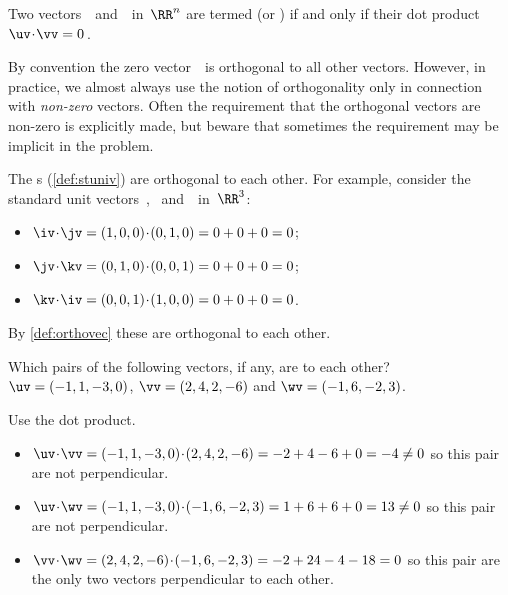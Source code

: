 \begin{definition} \label{def:orthovec}
Two vectors~\uv\ and~\vv\ in~\(\RR^n\) are termed
 (or )
if and only if their dot product \(\uv\cdot\vv=0\)\,.
\end{definition}

By convention the zero vector~\ov\ is orthogonal to all other vectors.
However, in practice, we almost always use the notion of orthogonality only in connection with \emph{non-zero} vectors.
Often the requirement that the orthogonal vectors are non-zero is explicitly made, but beware that sometimes the requirement may be implicit in the problem.


\begin{example} \label{eg:}
The s (\autoref{def:stuniv}) are orthogonal to each other.
For example, consider the standard unit vectors~\iv, \jv\ and~\kv\ in~\(\RR^3\):
\begin{itemize}
\item \(\iv\cdot\jv=(1,0,0)\cdot(0,1,0)=0+0+0=0\);
\item \(\jv\cdot\kv=(0,1,0)\cdot(0,0,1)=0+0+0=0\);
\item \(\kv\cdot\iv=(0,0,1)\cdot(1,0,0)=0+0+0=0\).
\end{itemize}
By \autoref{def:orthovec} these are orthogonal to each other.
\end{example}


\begin{example} \label{eg:}
Which pairs of the following vectors, if any, are  to each other?
\(\uv=(-1,1,-3,0)\), \(\vv=(2,4,2,-6)\) and \(\wv=(-1,6,-2,3)\).
\begin{solution} 
Use the dot product.
\begin{itemize}
\item \(\uv\cdot\vv =(-1,1,-3,0)\cdot(2,4,2,-6) =-2+4-6+0 =-4 \neq0\) so this pair are not perpendicular. 
\item \(\uv\cdot\wv =(-1,1,-3,0)\cdot(-1,6,-2,3) =1+6+6+0 =13 \neq0\) so this pair are not perpendicular. 
\item \(\vv\cdot\wv =(2,4,2,-6)\cdot(-1,6,-2,3) =-2+24-4-18 =0\) so this pair are the only two vectors perpendicular to each other. 
\end{itemize}
\end{solution}
\end{example}



